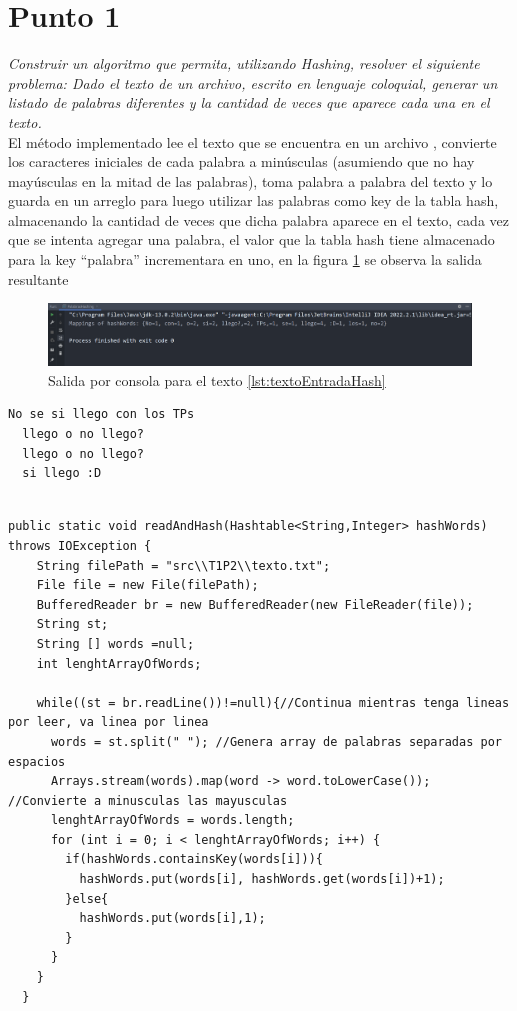 \newpage
\section{Punto 1}
\textit{Construir un algoritmo que permita, utilizando Hashing, resolver el siguiente problema: Dado el texto de un archivo, escrito en lenguaje coloquial, generar un listado de palabras diferentes y la cantidad de veces que aparece cada una en el texto.
}\\


El método implementado lee el texto que se encuentra en un archivo , convierte los caracteres iniciales de cada palabra a minúsculas (asumiendo que no hay mayúsculas en la mitad de las palabras), toma palabra a palabra del texto y lo guarda en un arreglo para luego utilizar las palabras como key de la tabla hash, almacenando la cantidad de veces que dicha palabra aparece en el texto, cada vez que se intenta agregar una palabra, el valor que la tabla hash tiene almacenado para la key ``palabra'' incrementara en uno, en la figura \ref{fig:Consola hash palabra} se observa la salida resultante

\begin{figure}
  \centering
  \includegraphics[width=\textwidth, scale=1]{Images/Punto3/ConsolaHashPalabra.png}
  \caption{Salida por consola para el texto \ref{lst:textoEntradaHash} }
  \label{fig:Consola hash palabra}
\end{figure}

\begin{lstlisting}[style=java, caption= Texto de entrada, label={lst:textoEntradaHash}]
  No se si llego con los TPs
  llego o no llego?
  llego o no llego?
  si llego :D
  
 \end{lstlisting}
 \label{fig:Traza ordenamiento por conteo}

 \begin{lstlisting}[style=java, caption= Metodo readAndHash()\cite{readAndHashMetodo}]
  public static void readAndHash(Hashtable<String,Integer> hashWords) throws IOException {
    String filePath = "src\\T1P2\\texto.txt";
    File file = new File(filePath);
    BufferedReader br = new BufferedReader(new FileReader(file));
    String st;
    String [] words =null;
    int lenghtArrayOfWords;

    while((st = br.readLine())!=null){//Continua mientras tenga lineas por leer, va linea por linea
      words = st.split(" "); //Genera array de palabras separadas por espacios
      Arrays.stream(words).map(word -> word.toLowerCase()); //Convierte a minusculas las mayusculas
      lenghtArrayOfWords = words.length;
      for (int i = 0; i < lenghtArrayOfWords; i++) {
        if(hashWords.containsKey(words[i])){
          hashWords.put(words[i], hashWords.get(words[i])+1);
        }else{
          hashWords.put(words[i],1);
        }
      }
    }
  }
 \end{lstlisting}